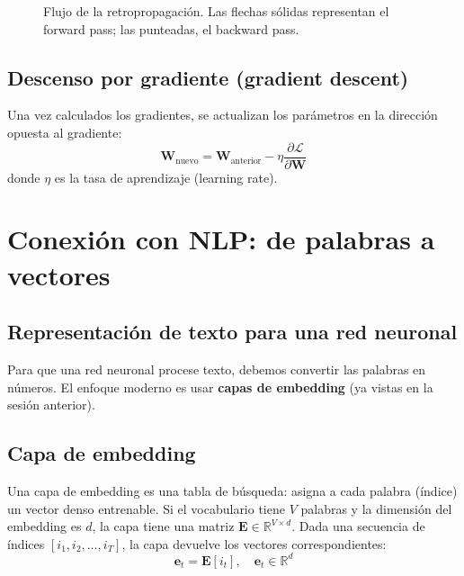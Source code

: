 \documentclass[12pt,a4paper,openany,oneside]{book}
\begin{document}
\begin{figure}[h]
\centering
{}
\caption{Flujo de la retropropagación. Las flechas sólidas representan el forward pass; las punteadas, el backward pass.}
\label{fig:backprop}
\end{figure}

\subsection{Descenso por gradiente (gradient descent)}
Una vez calculados los gradientes, se actualizan los parámetros en la dirección opuesta al gradiente:
\[
\mathbf{W}_{\text{nuevo}} = \mathbf{W}_{\text{anterior}} - \eta \frac{\partial \mathcal{L}}{\partial \mathbf{W}}
\]
donde \(\eta\) es la tasa de aprendizaje (learning rate).

\section{Conexión con NLP: de palabras a vectores}

\subsection{Representación de texto para una red neuronal}
Para que una red neuronal procese texto, debemos convertir las palabras en números. El enfoque moderno es usar \textbf{capas de embedding} (ya vistas en la sesión anterior).

\subsection{Capa de embedding}
Una capa de embedding es una tabla de búsqueda: asigna a cada palabra (índice) un vector denso entrenable. Si el vocabulario tiene \(V\) palabras y la dimensión del embedding es \(d\), la capa tiene una matriz \(\mathbf{E} \in \mathbb{R}^{V \times d}\). Dada una secuencia de índices \([i_1, i_2, \dots, i_T]\), la capa devuelve los vectores correspondientes:
\[
\mathbf{e}_{t} = \mathbf{E}[i_t], \quad \mathbf{e}_t \in \mathbb{R}^d
\]
\end{document}

